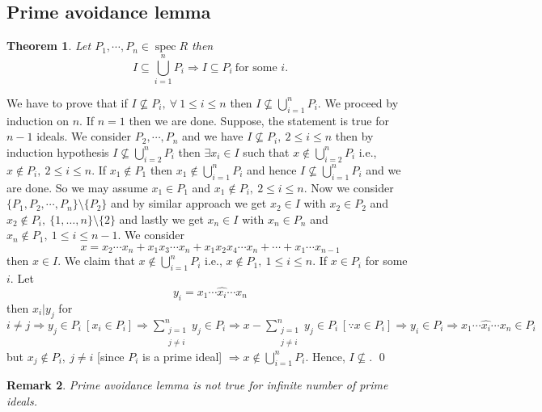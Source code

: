 \documentclass[11pt]{amsart}
\newtheorem{theorem}{Theorem}[section]
\newtheorem{remark}[theorem]{Remark}%
\begin{document}
\subsection{Prime avoidance lemma}

\begin{theorem}

Let $P_1,\cdots ,P_n\in \operatorname{spec}R$ then $$I\subseteq \displaystyle\bigcup _{i=1}^n P_i \Rightarrow I\subseteq P_i~\text{for some $i$}.$$

\end{theorem}

\proof We have to prove that if $I\nsubseteq P_i,~\forall~1\leq i\leq n$ then $I\nsubseteq \displaystyle\bigcup_{i=1}^n P_i.$ We proceed by induction on $n.$ If $n=1$ then we are done. Suppose, the statement is true for $n-1$ ideals. We consider $P_2,\cdots ,P_n$ and we have $I\nsubseteq P_i,~2\leq i\leq n$ then by induction hypothesis $I\nsubseteq \displaystyle\bigcup_{i=2}^n P_i$ then $\exists x_i\in I$ such that $x\notin \displaystyle\bigcup_{i=2}^n P_i$ i.e., $x\notin P_i,~2\leq i\leq n.$ If $x_1\notin P_1$ then $x_1\notin \displaystyle\bigcup_{i=1}^n P_i$ and hence $I\nsubseteq \displaystyle\bigcup_{i=1}^n P_i$ and we are done. So we may assume $x_1\in P_1$ and $x_1\notin P_i,~2\leq i\leq n.$ Now we consider $\{P_1,P_2,\cdots ,P_n\}\setminus \{P_2\}$ and by similar approach we get $x_2\in I$ with $x_2\in P_2$ and $x_2\notin P_i,~\{1,\dots ,n\}\setminus \{2\}$ and lastly we get $x_n\in I$ with $x_n\in P_n$ and $x_n\notin P_1,~1\leq i\leq n-1.$ We consider $$x=x_2\cdots x_n+x_1x_3\cdots x_n+x_1x_2x_4\cdots x_n+\cdots +x_1\cdots x_{n-1}$$
then $x\in I.$ We claim that $x\notin \displaystyle\bigcup_{i=1}^n P_i$ i.e., $x\notin P_1,~1\leq i\leq n.$ If $x\in P_i$ for some $i.$ Let $$y_i=x_1\cdots \widehat{x_i}\cdots x_n$$ then $x_i|y_j$ for $i \neq j \Rightarrow y_j\in P_i ~[x_i\in P_i] \Rightarrow  \displaystyle\sum_{\substack{j=1\\ j\neq i}}^n y_j\in P_i \Rightarrow x-\displaystyle\sum_{\substack{j=1\\ j\neq i}}^n y_j\in P_i ~[\because x\in P_i] \Rightarrow y_i\in P_i \Rightarrow x_1\cdots \widehat{x_i}\cdots x_n\in P_i$ but $x_j\notin P_i,~j\neq i$ [since $P_i$ is a prime ideal] $\Rightarrow x\notin \displaystyle\bigcup_{i=1}^n P_i.$ Hence, $I\nsubseteq .$ \qed

\begin{remark}

Prime avoidance lemma is not true for infinite number of prime ideals.

\end{remark}
\end{document}
